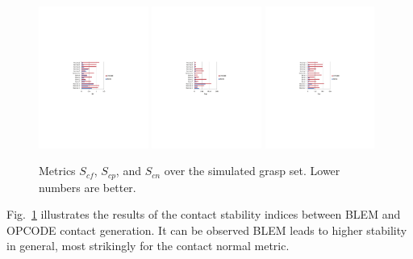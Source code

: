 \begin{figure}
\centering
\includegraphics[width=0.32\textwidth]{images/ssoch/scf_metrics.pdf}
\includegraphics[width=0.32\textwidth]{images/ssoch/scp_metrics.pdf}
\includegraphics[width=0.32\textwidth]{images/ssoch/scn_metrics.pdf}
\caption{Metrics $S_{cf}$, $S_{cp}$, and $S_{cn}$ over the simulated grasp set. Lower numbers are better.}
\label{fig:AllMetrics}
\end{figure}

Fig.~\ref{fig:AllMetrics} illustrates the results of the contact stability indices between BLEM and OPCODE contact generation. It can be observed BLEM leads to higher stability in general, most strikingly for the contact normal metric.

